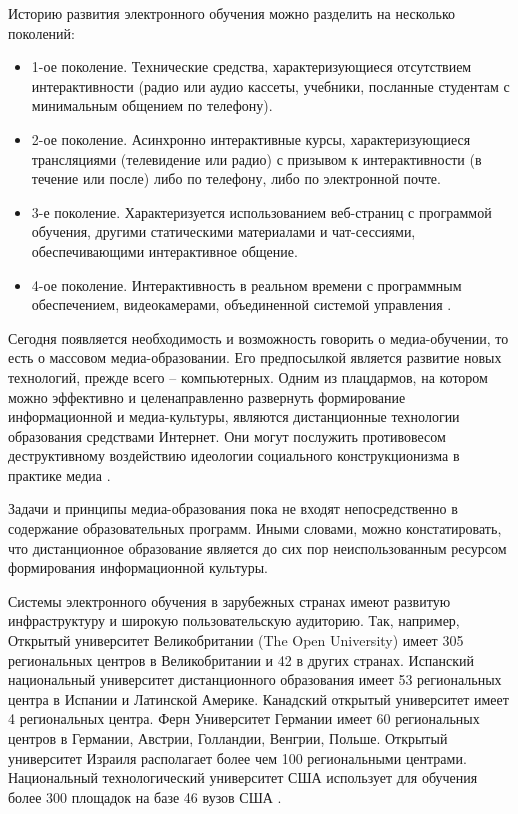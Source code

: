 Историю развития электронного обучения можно разделить на несколько поколений:

\begin{itemize}
\item 1-ое поколение. Технические средства, характеризующиеся отсутствием интерактивности (радио или аудио кассеты, учебники, посланные студентам с минимальным общением по телефону).
\item 2-ое поколение. Асинхронно интерактивные курсы, характеризующиеся трансляциями (телевидение или радио) с призывом к интерактивности (в течение или после) либо по телефону, либо по электронной почте.
\item 3-е поколение. Характеризуется использованием веб-страниц с программой обучения, другими статическими материалами и чат-сессиями, обеспечивающими интерактивное общение.
\item 4-ое поколение. Интерактивность в реальном времени с программным обеспечением, видеокамерами, объединенной системой управления \cite{rad2005create}.
\end{itemize}

Сегодня появляется необходимость и возможность говорить о медиа-обучении, то есть о массовом медиа-образовании\cite{dabbagh2012personal}. Его предпосылкой является развитие новых технологий, прежде всего – компьютерных. Одним из плацдармов, на котором можно эффективно и целенаправленно развернуть формирование  информационной и медиа-культуры, являются дистанционные технологии образования средствами Интернет. Они могут послужить противовесом деструктивному воздействию идеологии социального конструкционизма в практике медиа \cite{kalmikov2009learning}.

Задачи и принципы медиа-образования пока не входят непосредственно в содержание образовательных программ. Иными словами, можно констатировать, что дистанционное образование является до сих пор неиспользованным ресурсом формирования информационной культуры. 

Системы электронного обучения в зарубежных странах имеют развитую инфраструктуру и широкую пользовательскую аудиторию. Так, например, Открытый университет Великобритании (The Open University) имеет 305 региональных центров в Великобритании и 42 в других странах. Испанский национальный университет дистанционного образования имеет 53 региональных центра в Испании и Латинской Америке. Канадский открытый университет имеет 4 региональных центра. Ферн Университет Германии имеет 60 региональных центров в Германии, Австрии, Голландии, Венгрии, Польше. Открытый университет Израиля располагает более чем 100 региональными центрами. Национальный технологический университет США использует для обучения более 300 площадок на базе 46 вузов США \cite{korneeva2007state}. 

